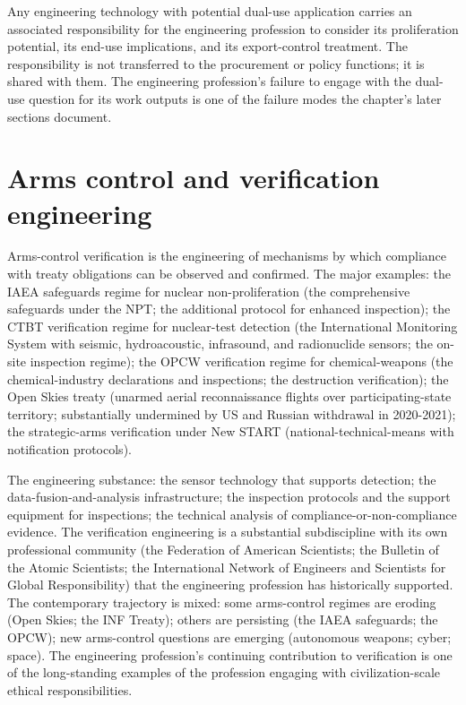 \begin{principle}
Any engineering technology with potential dual-use application carries an associated responsibility for the engineering profession to consider its proliferation potential, its end-use implications, and its export-control treatment. The responsibility is not transferred to the procurement or policy functions; it is shared with them. The engineering profession's failure to engage with the dual-use question for its work outputs is one of the failure modes the chapter's later sections document.
\end{principle}

\section{Arms control and verification engineering}

Arms-control verification is the engineering of mechanisms by which compliance with treaty obligations can be observed and confirmed. The major examples: the IAEA safeguards regime for nuclear non-proliferation (the comprehensive safeguards under the NPT; the additional protocol for enhanced inspection); the CTBT verification regime for nuclear-test detection (the International Monitoring System with seismic, hydroacoustic, infrasound, and radionuclide sensors; the on-site inspection regime); the OPCW verification regime for chemical-weapons (the chemical-industry declarations and inspections; the destruction verification); the Open Skies treaty (unarmed aerial reconnaissance flights over participating-state territory; substantially undermined by US and Russian withdrawal in 2020-2021); the strategic-arms verification under New START (national-technical-means with notification protocols).

The engineering substance: the sensor technology that supports detection; the data-fusion-and-analysis infrastructure; the inspection protocols and the support equipment for inspections; the technical analysis of compliance-or-non-compliance evidence. The verification engineering is a substantial subdiscipline with its own professional community (the Federation of American Scientists; the Bulletin of the Atomic Scientists; the International Network of Engineers and Scientists for Global Responsibility) that the engineering profession has historically supported. The contemporary trajectory is mixed: some arms-control regimes are eroding (Open Skies; the INF Treaty); others are persisting (the IAEA safeguards; the OPCW); new arms-control questions are emerging (autonomous weapons; cyber; space). The engineering profession's continuing contribution to verification is one of the long-standing examples of the profession engaging with civilization-scale ethical responsibilities.

